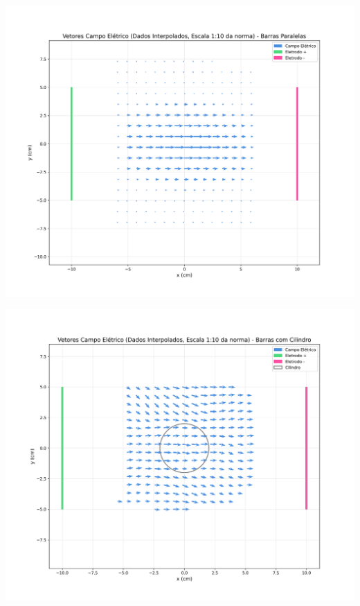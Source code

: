 \documentclass[column,brazilian,12pt,a4paper,final]{article}
\begin{document}
    \begin{minipage}{0.8\textwidth}
        \centering
        \includegraphics[width=\linewidth]{Campo Placas.png}
       
        \label{fig:imagem2}
    \end{minipage}
 \begin{minipage}{0.8\textwidth}
    \centering
    \includegraphics[width=\linewidth]{Campo Cilindro.png}
    \label{fig:enter-label}
\end{minipage}
    \centering
\end{document}
